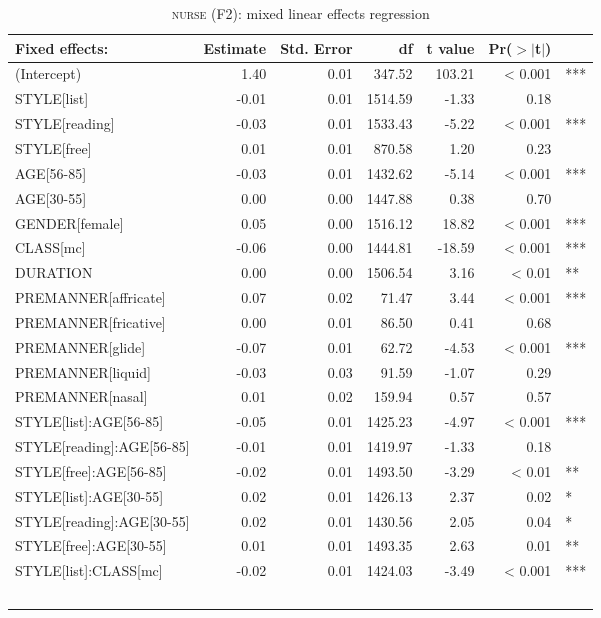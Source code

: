 {
	\footnotesize
	\begin{longtable}[c]{p{}rrrrrl}
		\caption{\textsc{nurse} (F2): mixed linear effects regression}\label{tab.regression.nurse.f2}\\
				
		\hline
		Fixed effects: & Estimate & Std. Error & df & t value & Pr($>$$|$t$|$) & \\ 
		\hline
		(Intercept) & 1.40 & 0.01 & 347.52 & 103.21 & < 0.001 & *** \\ 
		STYLE[list] & -0.01 & 0.01 & 1514.59 & -1.33 & 0.18 & \\ 
		STYLE[reading] & -0.03 & 0.01 & 1533.43 & -5.22 & < 0.001 & *** \\ 
		STYLE[free] & 0.01 & 0.01 & 870.58 & 1.20 & 0.23 & \\ 
		AGE[56-85] & -0.03 & 0.01 & 1432.62 & -5.14 & < 0.001 & *** \\ 
		AGE[30-55] & 0.00 & 0.00 & 1447.88 & 0.38 & 0.70 & \\ 
		GENDER[female] & 0.05 & 0.00 & 1516.12 & 18.82 & < 0.001 & *** \\ 
		CLASS[mc] & -0.06 & 0.00 & 1444.81 & -18.59 & < 0.001 & *** \\ 
		DURATION & 0.00 & 0.00 & 1506.54 & 3.16 & < 0.01 & ** \\ 
		PREMANNER[affricate] & 0.07 & 0.02 & 71.47 & 3.44 & < 0.001 & *** \\ 
		PREMANNER[fricative] & 0.00 & 0.01 & 86.50 & 0.41 & 0.68 & \\ 
		PREMANNER[glide] & -0.07 & 0.01 & 62.72 & -4.53 & < 0.001 & *** \\ 
		PREMANNER[liquid] & -0.03 & 0.03 & 91.59 & -1.07 & 0.29 & \\ 
		PREMANNER[nasal] & 0.01 & 0.02 & 159.94 & 0.57 & 0.57 & \\ 
		STYLE[list]:AGE[56-85] & -0.05 & 0.01 & 1425.23 & -4.97 & < 0.001 & *** \\ 
		STYLE[reading]:AGE[56-85] & -0.01 & 0.01 & 1419.97 & -1.33 & 0.18 & \\ 
		STYLE[free]:AGE[56-85] & -0.02 & 0.01 & 1493.50 & -3.29 & < 0.01 & ** \\ 
		STYLE[list]:AGE[30-55] & 0.02 & 0.01 & 1426.13 & 2.37 & 0.02 & * \\ 
		STYLE[reading]:AGE[30-55] & 0.02 & 0.01 & 1430.56 & 2.05 & 0.04 & * \\ 
		STYLE[free]:AGE[30-55] & 0.01 & 0.01 & 1493.35 & 2.63 & 0.01 & **\\ 
		STYLE[list]:CLASS[mc] & -0.02 & 0.01 & 1424.03 & -3.49 & < 0.001 & *** \\ 
$$
\end{longtable}}

